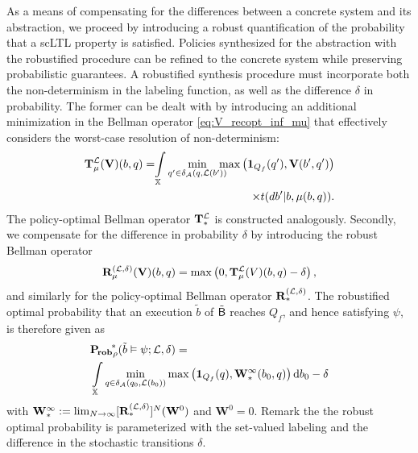 \documentclass{ifacconf}
\begin{document}
As a means of compensating for the differences between a concrete system and its abstraction, we proceed by introducing a robust quantification of the probability that a scLTL property is satisfied. Policies synthesized for the abstraction with the robustified procedure can be refined to the concrete system while preserving probabilistic guarantees. A robustified synthesis procedure must incorporate both the non-determinism in the labeling function, as well as the difference $\delta$ in probability. The former can be dealt with by introducing an additional minimization in the Bellman operator \eqref{eq:V_recopt_inf_mu} that effectively considers the worst-case resolution of non-determinism:
\begin{equation}
\label{eq:V_recopt_nondet}
\begin{aligned}
  \Bel_\pol^\Labset (\mathbf V)(b,q) = \hspace{-1mm} \int_\X  
  \min_{q' \in \delta_\FSA(q, \Labset( b'))} \hspace{-3mm} \max \left( \mathbf 1_{Q_f}(q'), \mathbf V( b',q') \right)  \\
   \times {\tr}(d b'|b,\pol(b,q)).
\end{aligned}
\end{equation}
The policy-optimal Bellman operator ${\mathbf {T}}_\ast^{\mathcal{L}}$ is constructed analogously. Secondly, we compensate for the difference in probability $\delta$ by introducing the robust Bellman operator
\begin{equation}
  \label{eq:V_recopt_nondet_rob}
  {\mathbf {R}}_{\mu}^{(\mathcal{L},\delta)} (\mathbf V)(b,q) = \max \left( 0, {\mathbf {T}}_{\mu}^{\mathcal{L}} (V)(b,q) - \delta  \right),
\end{equation}
and similarly for the policy-optimal Bellman operator ${\mathbf {R}}_\ast^{(\mathcal{L}, \delta)}$. The robustified optimal probability that an execution $\tilde b$ of $\tilde {\mathsf{B}}$ reaches $Q_f$, and hence satisfying $\psi$, is therefore given as
\begin{equation}
\label{eq:prob:robust_optimal}
\begin{aligned}
  &\mathbf{P_{\! rob}}_\init^{\!\ast} (\tilde b \vDash \psi; \Labset,\delta) =\\ & \int_{\X}\min_{\bar q \in \delta_\FSA(q_0,\Labset(b_0))}  \max \left( \mathbf 1_{Q_f}(\bar q), \mathbf W^\infty_\ast(b_0,\bar q) \right) \mathrm{d} b_0 -\delta
\end{aligned}
\end{equation} 
with 
$\mathbf W^\infty_\ast :=  \lim_{N\rightarrow\infty}[{\mathbf {R}}_\ast^{(\mathcal{L},\delta)}]^N (\mathbf W^0)$ and $\mathbf W^0=0$. Remark the the robust optimal probability is parameterized with the set-valued labeling and the difference in the stochastic transitions $\delta$.
\end{document}
